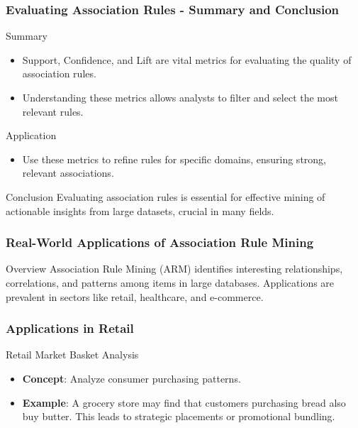 \documentclass[aspectratio=169]{beamer}
\begin{document}
\begin{frame}[fragile]
    \frametitle{Evaluating Association Rules - Summary and Conclusion}
    \begin{block}{Summary}
        \begin{itemize}
            \item Support, Confidence, and Lift are vital metrics for evaluating the quality of association rules.
            \item Understanding these metrics allows analysts to filter and select the most relevant rules.
        \end{itemize}
    \end{block}
    \begin{block}{Application}
        \begin{itemize}
            \item Use these metrics to refine rules for specific domains, ensuring strong, relevant associations.
        \end{itemize}
    \end{block}
    \begin{block}{Conclusion}
        Evaluating association rules is essential for effective mining of actionable insights from large datasets, crucial in many fields.
    \end{block}
\end{frame}

\begin{frame}[fragile]
    \frametitle{Real-World Applications of Association Rule Mining}
    \begin{block}{Overview}
        Association Rule Mining (ARM) identifies interesting relationships, correlations, and patterns among items in large databases.
        Applications are prevalent in sectors like retail, healthcare, and e-commerce.
    \end{block}
\end{frame}

\begin{frame}[fragile]
    \frametitle{Applications in Retail}
    \begin{block}{Retail Market Basket Analysis}
        \begin{itemize}
            \item \textbf{Concept}: Analyze consumer purchasing patterns.
            \item \textbf{Example}: 
            A grocery store may find that customers purchasing bread also buy butter. 
            This leads to strategic placements or promotional bundling.
        \end{itemize}
    \end{block}
\end{frame}
\end{document}
